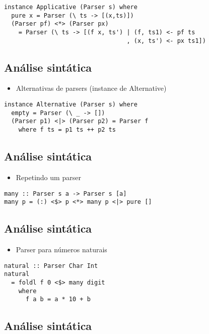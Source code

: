\documentclass[11pt]{article}
\begin{document}
\begin{verbatim}
instance Applicative (Parser s) where 
  pure x = Parser (\ ts -> [(x,ts)])
  (Parser pf) <*> (Parser px)
    = Parser (\ ts -> [(f x, ts') | (f, ts1) <- pf ts
                                  , (x, ts') <- px ts1])
\end{verbatim}
\subsection*{Análise sintática}
\label{sec:orgfe02ca2}

\begin{itemize}
\item Alternativas de parsers (instance de Alternative)
\end{itemize}

\begin{verbatim}
instance Alternative (Parser s) where 
  empty = Parser (\ _ -> [])
  (Parser p1) <|> (Parser p2) = Parser f 
    where f ts = p1 ts ++ p2 ts
\end{verbatim}
\subsection*{Análise sintática}
\label{sec:org402bca7}

\begin{itemize}
\item Repetindo um parser
\end{itemize}

\begin{verbatim}
many :: Parser s a -> Parser s [a]
many p = (:) <$> p <*> many p <|> pure []
\end{verbatim}
\subsection*{Análise sintática}
\label{sec:org3f04be7}

\begin{itemize}
\item Parser para números naturais
\end{itemize}

\begin{verbatim}
natural :: Parser Char Int 
natural 
  = foldl f 0 <$> many digit  
    where 
      f a b = a * 10 + b 
\end{verbatim}
\subsection*{Análise sintática}
\label{sec:org14026e3}
\end{document}
